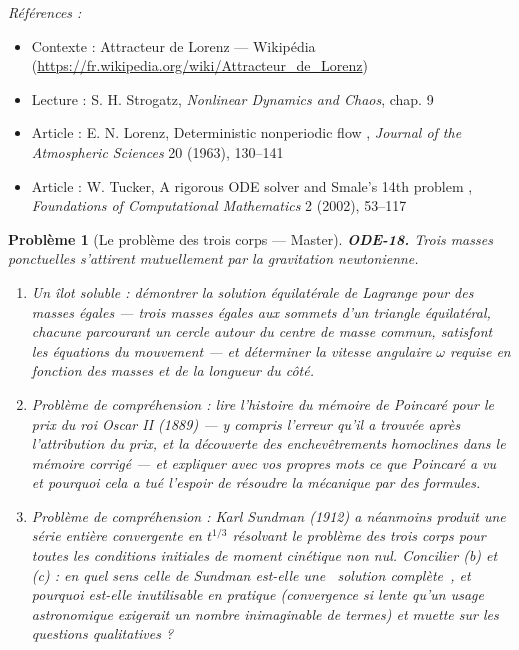 \documentclass[11pt]{article}
\newtheorem{problem}{Problème}
\newenvironment{refs}{\par\small\noindent\emph{Références :}\begin{itemize}\setlength\itemsep{0pt}}{\end{itemize}\normalsize}
\begin{document}
\begin{refs}
\item Contexte : Attracteur de Lorenz --- Wikipédia (\url{https://fr.wikipedia.org/wiki/Attracteur_de_Lorenz})
\item Lecture : S. H. Strogatz, \textit{Nonlinear Dynamics and Chaos}, chap. 9
\item Article : E. N. Lorenz, \og{} Deterministic nonperiodic flow \fg{}, \textit{Journal of the Atmospheric Sciences} 20 (1963), 130--141
\item Article : W. Tucker, \og{} A rigorous ODE solver and Smale's 14th problem \fg{}, \textit{Foundations of Computational Mathematics} 2 (2002), 53--117
\end{refs}

\bigskip

\begin{problem}[{Le problème des trois corps --- Master}]
\textbf{ODE-18.} Trois masses ponctuelles s'attirent mutuellement par la gravitation
newtonienne.
\begin{enumerate}
\item[(a)] Un îlot soluble : démontrer la solution équilatérale de Lagrange pour des masses égales ---
trois masses égales aux sommets d'un triangle équilatéral, chacune parcourant un cercle autour du
centre de masse commun, satisfont les équations du mouvement --- et déterminer la vitesse angulaire
$ \omega $ requise en fonction des masses et de la longueur du côté.
\item[(b)] Problème de compréhension : lire l'histoire du mémoire de Poincaré pour le prix du roi
Oscar II (1889) --- y compris l'erreur qu'il a trouvée après l'attribution du prix, et la découverte
des enchevêtrements homoclines dans le mémoire corrigé --- et expliquer avec vos propres mots ce que
Poincaré a vu et pourquoi cela a tué l'espoir de résoudre la mécanique par des formules.
\item[(c)] Problème de compréhension : Karl Sundman (1912) a néanmoins produit une série entière
convergente en $ t^{1/3} $ résolvant le problème des trois corps pour toutes les conditions
initiales de moment cinétique non nul. Concilier (b) et (c) : en quel sens celle de Sundman est-elle
une \og{}~solution complète~\fg{}, et pourquoi est-elle inutilisable en pratique
(convergence si lente qu'un usage astronomique exigerait un nombre inimaginable de termes) et
muette sur les questions qualitatives ?
\end{enumerate}

\end{problem}
\end{document}
